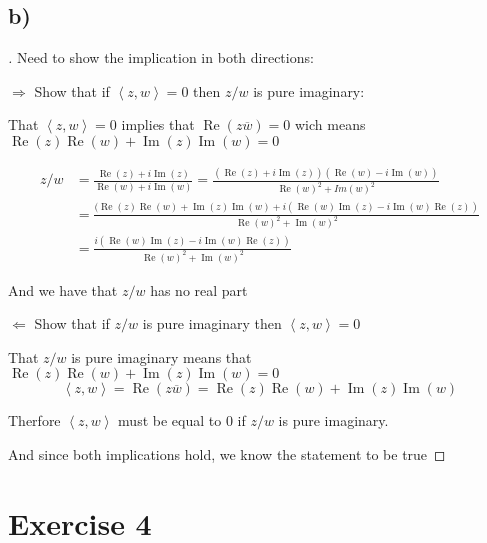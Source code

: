 \documentclass{article}
\begin{document}
\subsection*{b)}
\begin{proof}[\unskip\nopunct]

  Need to show the implication in both directions:


  $\pmb{\Rightarrow}$ Show that if $\left<z, w \right> = 0 $ then  $z/w$ is pure imaginary:

  That $\left<z, w \right> = 0 $ implies that $\operatorname{Re}(z\overline{w}) = 0$ wich means $\operatorname{Re}(z)\operatorname{Re}(w) + \operatorname{Im}(z)\operatorname{Im}(w) = 0$

  \begin{align*}z/w &= \frac{\operatorname{Re}(z) + i\operatorname{Im}(z)}{\operatorname{Re}(w) + i\operatorname{Im}(w)} = \frac{(\operatorname{Re}(z) + i\operatorname{Im}(z))(\operatorname{Re}(w) - i\operatorname{Im}(w))}{\operatorname{Re}(w)^2 + Im(w)^2} \\&= \frac{(\operatorname{Re}(z)\operatorname{Re}(w) + \operatorname{Im}(z)\operatorname{Im}(w) + i(\operatorname{Re}(w)\operatorname{Im}(z) - i\operatorname{Im}(w)\operatorname{Re}(z))}{\operatorname{Re}(w)^2 + \operatorname{Im}(w)^2} \\
    &= \frac{i(\operatorname{Re}(w)\operatorname{Im}(z) - i\operatorname{Im}(w)\operatorname{Re}(z))}{\operatorname{Re}(w)^2 + \operatorname{Im}(w)^2}
  \end{align*}

  And we have that $z/w$ has no real part


  $\pmb{\Leftarrow}$ Show that if $z/w$ is pure imaginary then $\left<z, w \right> = 0$

  That $z/w$ is pure imaginary means that $\operatorname{Re}(z)\operatorname{Re}(w) + \operatorname{Im}(z)\operatorname{Im}(w) = 0$
  \[\left<z,w \right> = \operatorname{Re}(z\overline{w}) = \operatorname{Re}(z)\operatorname{Re}(w) + \operatorname{Im}(z)\operatorname{Im}(w) \]

  Therfore $\left<z,w \right>$ must be equal to 0 if $z/w$ is pure imaginary.

  And since both implications hold, we know the statement to be true

\end{proof}



\section*{Exercise 4}
\end{document}

